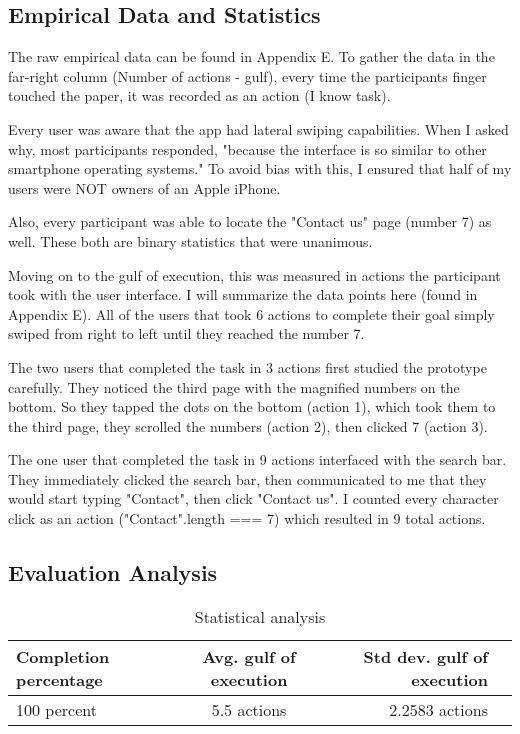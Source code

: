 \subsection{Empirical Data and Statistics}
The raw empirical data can be found in Appendix E. To gather the data in the far-right column (Number of actions - gulf), every time the participants finger touched the paper, it was recorded as an action (I know task).

Every user was aware that the app had lateral swiping capabilities. When I asked why, most participants responded, "because the interface is so similar to other smartphone operating systems." To avoid bias with this, I ensured that half of my users were NOT owners of an Apple iPhone.

Also, every participant was able to locate the "Contact us" page (number 7) as well. These both are binary statistics that were unanimous.

Moving on to the gulf of execution, this was measured in actions the participant took with the user interface. I will summarize the data points here (found in Appendix E). All of the users that took 6 actions to complete their goal simply swiped from right to left until they reached the number 7.

The two users that completed the task in 3 actions first studied the prototype carefully. They noticed the third page with the magnified numbers on the bottom. So they tapped the dots on the bottom (action 1), which took them to the third page, they scrolled the numbers (action 2), then clicked 7 (action 3).

The one user that completed the task in 9 actions interfaced with the search bar. They immediately clicked the search bar, then communicated to me that they would start typing "Contact", then click "Contact us". I counted every character click as an action ("Contact".length === 7) which resulted in 9 total actions.

\subsection{Evaluation Analysis}

\begin{table}[H]
  \centering
  \caption{Statistical analysis}
  \label{table:1}
  \begin{tabular}{@{}lcrl@{}}
    \textbf{Completion percentage} & \textbf{Avg. gulf of execution} & \textbf{Std dev. gulf of execution}\\
    \midrule
    100 percent & 5.5 actions & 2.2583 actions \\
  \end{tabular}
\end{table}

